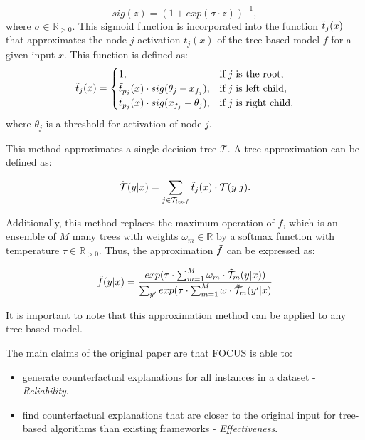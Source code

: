 \begin{equation}
\label{eq:sigma}
    sig(z) = (1 + exp(\sigma \cdot z))^{-1},
\end{equation}
where $\sigma \in \mathbb{R}_{>0}$.
This sigmoid function is incorporated into the function $\Tilde{t}_j(x)$ that approximates the node $j$ activation $t_j(x)$ of the tree-based model $f$ for a given input $x$. This function is defined as:
\begin{equation}
    \Tilde{t}_j(x) = \begin{cases}
1, & \textrm{if \textit{j} is the root,}\\
\Tilde{t}_{p_j}(x) \cdot sig(\theta_{j} - x_{f_j}), & \textrm{if \textit{j} is left child,}\\
\Tilde{t}_{p_j}(x) \cdot sig(x_{f_j} - \theta_{j}), & \textrm{if \textit{j} is right child},
\end{cases}
\end{equation}
where $\theta_j$ is a threshold for activation of node $j$.

This method approximates a single decision tree $\mathcal{T}$. A tree approximation can be defined as:

\begin{equation}
    \Tilde{\mathcal{T}}(y|x) = \sum_{j \in \mathcal{T}_{leaf}} \Tilde{t}_j(x) \cdot \mathcal{T}(y|j).
\end{equation}

Additionally, this method replaces the maximum operation of $f$, which is an ensemble of $M$ many trees with weights $\omega_m \in \mathbb{R}$ by a softmax function with temperature $\tau \in \mathbb{R}_{>0}$. Thus, the approximation $\Tilde{f}$ can be expressed as:

\begin{equation}
\label{eq:temperature}
    \Tilde{f}(y|x) = \frac{exp(\tau \cdot \sum^{M}_{m=1}\omega_m \cdot \Tilde{\mathcal{T}}_m(y|x))}{\sum_{y'}exp(\tau \cdot \sum^M_{m=1}\omega \cdot \Tilde{\mathcal{T}}_m(y'|x)}
\end{equation}

It is important to note that this approximation method can be applied to any tree-based model.

The main claims of the original paper are that FOCUS is able to:
\begin{itemize}
    \item generate counterfactual explanations for all instances in a dataset - \textit{Reliability}.
    \item find counterfactual explanations that are closer to the original input for tree-based algorithms than existing frameworks - \textit{Effectiveness}.
\end{itemize}

